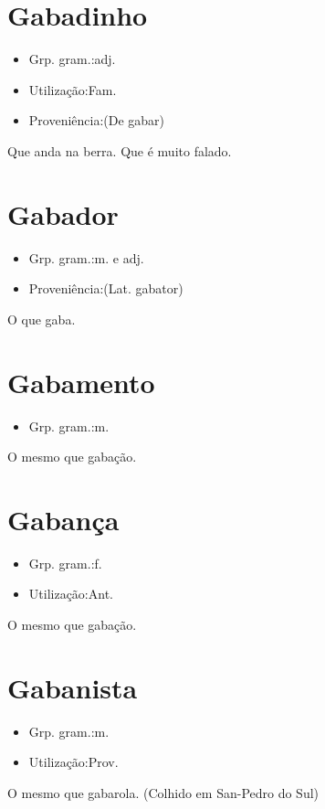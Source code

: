 \section{Gabadinho}
\begin{itemize}
\item {Grp. gram.:adj.}
\end{itemize}
\begin{itemize}
\item {Utilização:Fam.}
\end{itemize}
\begin{itemize}
\item {Proveniência:(De \textunderscore gabar\textunderscore )}
\end{itemize}
Que anda na berra.
Que é muito falado.
\section{Gabador}
\begin{itemize}
\item {Grp. gram.:m.  e  adj.}
\end{itemize}
\begin{itemize}
\item {Proveniência:(Lat. \textunderscore gabator\textunderscore )}
\end{itemize}
O que gaba.
\section{Gabamento}
\begin{itemize}
\item {Grp. gram.:m.}
\end{itemize}
O mesmo que \textunderscore gabação\textunderscore .
\section{Gabança}
\begin{itemize}
\item {Grp. gram.:f.}
\end{itemize}
\begin{itemize}
\item {Utilização:Ant.}
\end{itemize}
O mesmo que \textunderscore gabação\textunderscore .
\section{Gabanista}
\begin{itemize}
\item {Grp. gram.:m.}
\end{itemize}
\begin{itemize}
\item {Utilização:Prov.}
\end{itemize}
O mesmo que \textunderscore gabarola\textunderscore . (Colhido em San-Pedro do Sul)
